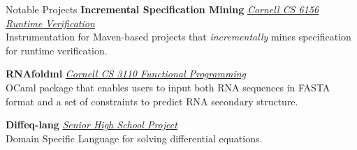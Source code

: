  
\begin{rSection}{Notable Projects}
	\textbf{Incremental Specification Mining} \href{https://github.com/zwt299/spec-miners}{\textit{Cornell CS 6156 Runtime Verification} \ExternalLink} \\
	Instrumentation for Maven-based projects that \textit{incrementally} mines specification for runtime verification.

	\textbf{RNAfoldml} \href{https://github.com/jpVinnie/RNAfoldml/}{\textit{Cornell CS 3110 Functional Programming} \ExternalLink} \\
	OCaml package that enables users to input both RNA sequences in FASTA format and a set of constraints to predict RNA secondary structure.

	\textbf{Diffeq-lang} \href{https://github.com/jpVinnie/diffeq-lang/}{\textit{Senior High School Project} \ExternalLink} \\
	Domain Specific Language for solving differential equations.

\end{rSection}